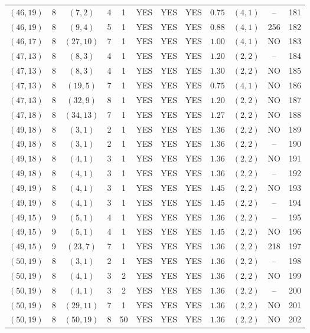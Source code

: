 \begin{longtable}{|c|c|c|c|c|c|c|c|c|c|c|c|}
$(46,19)$ & 8 & $(7,2)$ & 4 & 1 & YES & YES & YES & $0.75$ & $(4,1)$ & -- & 181\\
$(46,19)$ & 8 & $(9,4)$ & 5 & 1 & YES & YES & YES & $0.88$ & $(4,1)$ & 256 & 182\\
$(46,17)$ & 8 & $(27,10)$ & 7 & 1 & YES & YES & YES & $1.00$ & $(4,1)$ & NO & 183\\
$(47,13)$ & 8 & $(8,3)$ & 4 & 1 & YES & YES & YES & $1.20$ & $(2,2)$ & -- & 184\\
$(47,13)$ & 8 & $(8,3)$ & 4 & 1 & YES & YES & YES & $1.30$ & $(2,2)$ & NO & 185\\
$(47,13)$ & 8 & $(19,5)$ & 7 & 1 & YES & YES & YES & $0.75$ & $(4,1)$ & NO & 186\\
$(47,13)$ & 8 & $(32,9)$ & 8 & 1 & YES & YES & YES & $1.20$ & $(2,2)$ & NO & 187\\
$(47,18)$ & 8 & $(34,13)$ & 7 & 1 & YES & YES & YES & $1.27$ & $(2,2)$ & NO & 188\\
$(49,18)$ & 8 & $(3,1)$ & 2 & 1 & YES & YES & YES & $1.36$ & $(2,2)$ & NO & 189\\
$(49,18)$ & 8 & $(3,1)$ & 2 & 1 & YES & YES & YES & $1.36$ & $(2,2)$ & -- & 190\\
$(49,18)$ & 8 & $(4,1)$ & 3 & 1 & YES & YES & YES & $1.36$ & $(2,2)$ & NO & 191\\
$(49,18)$ & 8 & $(4,1)$ & 3 & 1 & YES & YES & YES & $1.36$ & $(2,2)$ & -- & 192\\
$(49,19)$ & 8 & $(4,1)$ & 3 & 1 & YES & YES & YES & $1.45$ & $(2,2)$ & NO & 193\\
$(49,19)$ & 8 & $(4,1)$ & 3 & 1 & YES & YES & YES & $1.45$ & $(2,2)$ & -- & 194\\
$(49,15)$ & 9 & $(5,1)$ & 4 & 1 & YES & YES & YES & $1.36$ & $(2,2)$ & -- & 195\\
$(49,15)$ & 9 & $(5,1)$ & 4 & 1 & YES & YES & YES & $1.45$ & $(2,2)$ & NO & 196\\
$(49,15)$ & 9 & $(23,7)$ & 7 & 1 & YES & YES & YES & $1.36$ & $(2,2)$ & 218 & 197\\
$(50,19)$ & 8 & $(3,1)$ & 2 & 1 & YES & YES & YES & $1.36$ & $(2,2)$ & -- & 198\\
$(50,19)$ & 8 & $(4,1)$ & 3 & 2 & YES & YES & YES & $1.36$ & $(2,2)$ & NO & 199\\
$(50,19)$ & 8 & $(4,1)$ & 3 & 2 & YES & YES & YES & $1.36$ & $(2,2)$ & -- & 200\\
$(50,19)$ & 8 & $(29,11)$ & 7 & 1 & YES & YES & YES & $1.36$ & $(2,2)$ & NO & 201\\
$(50,19)$ & 8 & $(50,19)$ & 8 & 50 & YES & YES & YES & $1.36$ & $(2,2)$ & NO & 202\\

\end{longtable}
